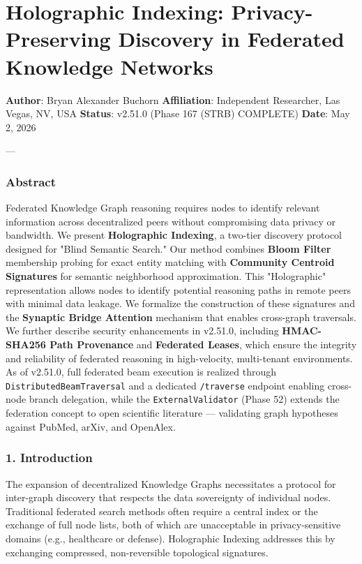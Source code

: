 \section{Holographic Indexing: Privacy-Preserving Discovery in Federated Knowledge Networks}

\textbf{Author}: Bryan Alexander Buchorn  
\textbf{Affiliation}: Independent Researcher, Las Vegas, NV, USA  
\textbf{Status}: v2.51.0 (Phase 167 (STRB) COMPLETE)
\textbf{Date}: May 2, 2026

---

\subsubsection{Abstract}
Federated Knowledge Graph reasoning requires nodes to identify relevant information across decen\-tralized peers without compr\-omising data privacy or bandwidth. We present \textbf{Holographic Indexing}, a two-tier discovery protocol designed for "Blind Semantic Search." Our method combines \textbf{Bloom Filter} \cite{bloom1970} membership probing for exact entity matching with \textbf{Community Centroid Signatures} for semantic neigh\-borhood appro\-ximation. This "Holographic" repre\-sentation allows nodes to identify potential reasoning paths in remote peers with minimal data leakage. We formalize the const\-ruction of these signatures and the \textbf{Synaptic Bridge Attention} mechanism that enables cross-graph traversals. We further describe security enhan\-cements in v2.51.0, including \textbf{HMAC-SHA256 Path Provenance} \cite{gentry2009} and \textbf{Federated Leases}, which ensure the integrity and reliability of federated reasoning in high-velocity, multi-tenant envir\-onments. As of v2.51.0, full federated beam execution is realized through \texttt{DistributedBeamTraversal} and a dedicated \texttt{/traverse} endpoint enabling cross-node branch delegation, while the \texttt{ExternalValidator} (Phase 52) extends the federation concept to open scientific literature — validating graph hypotheses against PubMed, arXiv, and OpenAlex.

\subsubsection{1. Introd\-uction}
The expansion of decen\-tralized Knowledge Graphs neces\-sitates a protocol for inter-graph discovery that respects the data sovereignty of individual nodes. Traditional federated search methods often require a central index or the exchange of full node lists, both of which are unacc\-eptable in privacy-sensitive domains (e.g., healthcare or defense). Holographic Indexing addresses this by exchanging compressed, non-reversible topological signatures.

